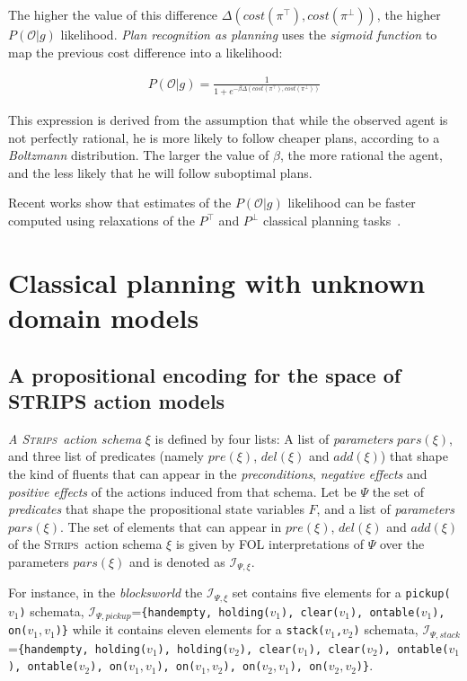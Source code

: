 \documentclass{article}
\newcommand{\strips}{\textsc{Strips}}
\begin{document}
The higher the value of this difference $\Delta(cost(\pi^\top),cost(\pi^\bot))$, the higher $P(\mathcal{O}|g)$ likelihood. {\em Plan recognition as planning} uses the {\em sigmoid function} to map the previous cost difference into a likelihood:

\begin{align}
P(\mathcal{O}|g) = \frac{1}{1+e^{-\beta\Delta(cost(\pi^\top),cost(\pi^\bot))}}
\end{align}

This expression is derived from the assumption that while the observed agent is not perfectly rational, he is more likely to follow cheaper plans, according to a {\em Boltzmann} distribution. The larger the value of $\beta$, the more rational the agent, and the less likely that he will follow suboptimal plans.

Recent works show that estimates of the $P(\mathcal{O}|g)$ likelihood can be faster computed using relaxations of the $P^{\top}$ and $P^{\bot}$ classical planning tasks~\cite{pereira2017landmark}.


\section{Classical planning with unknown domain models}
\label{sec:planning}

\subsection{A propositional encoding for the space of STRIPS action models}
{\em A \strips\ action schema} $\xi$ is defined by four lists: A list of {\em parameters} $pars(\xi)$, and three list of predicates (namely $pre(\xi)$, $del(\xi)$ and $add(\xi)$) that shape the kind of fluents that can appear in the {\em preconditions}, {\em negative effects} and {\em positive effects} of the actions induced from that schema. Let be $\Psi$ the set of {\em predicates} that shape the propositional state variables $F$, and a list of {\em parameters} $pars(\xi)$. The set of elements that can appear in $pre(\xi)$, $del(\xi)$ and $add(\xi)$ of the \strips\ action schema $\xi$ is given by FOL interpretations of $\Psi$ over the parameters $pars(\xi)$ and is denoted as ${\mathcal I}_{\Psi,\xi}$.

For instance, in the {\em blocksworld} the ${\mathcal I}_{\Psi,\xi}$ set contains five elements for a {\small \tt pickup($v_1$)} schemata, ${\mathcal I}_{\Psi,pickup}$={\small\tt\{handempty, holding($v_1$), clear($v_1$), ontable($v_1$), on($v_1,v_1$)\}} while it contains eleven elements for a {\small \tt stack($v_1$,$v_2$)} schemata, ${\mathcal I}_{\Psi,stack}$={\small\tt\{handempty, holding($v_1$), holding($v_2$), clear($v_1$), clear($v_2$), ontable($v_1$), ontable($v_2$), on($v_1,v_1$), on($v_1,v_2$), on($v_2,v_1$), on($v_2,v_2$)\}}. 
\end{document}
